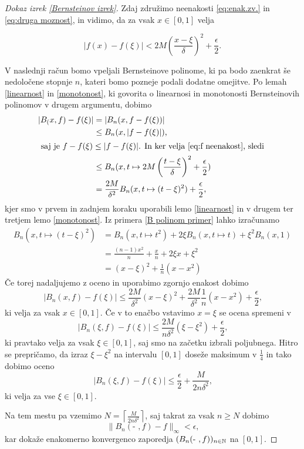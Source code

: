 \documentclass[a4paper, reqno]{amsart}
\theoremstyle{theorem}
\theoremstyle{definition}
\begin{document}
\begin{proof}[Dokaz \emph{izrek \ref{Bernsteinov izrek}}]
Zdaj združimo neenakosti \eqref{eq:enak.zv.} in \eqref{eq:druga moznost},
in vidimo, da za vsak $x \in [0,1]$ velja

\begin{equation}
	\label{eq:f neenakost}
	|f(x) - f(\xi)| < 2M\left( \frac{x - \xi}{\delta}\right)^2 + \frac{\epsilon}{2}\text{.}
\end{equation}

V naslednji račun bomo vpeljali Bernsteinove polinome, ki pa bodo zaenkrat še
nedoločene stopnje $n$, kateri bomo pozneje podali dodatne omejitve. Po lemah 
\ref{linearnost} in \ref{monotonost}, ki govorita o linearnosi in monotonosti 
Bernsteinovih polinomov v drugem argumentu, dobimo
\begin{align*}
	|B_(x, f) - f(\xi)| &= |B_n(x, f - f(\xi))|\\
	&\leq B_n(x, |f - f(\xi)|)\text{,}\\
\intertext{
		saj je $f - f(\xi) \leq |f - f(\xi)|$. In ker velja \eqref{eq:f neenakost}, sledi
}
	&\leq B_n(x, t \mapsto 2M\left(\frac{t - \xi}{\delta} \right)^2 + \frac{\epsilon}{2})\\
	&= \frac{2M}{\delta^2}B_n(x, t \mapsto (t - \xi)^2) + \frac{\epsilon}{2}\text{,}
\end{align*}
kjer smo v prvem in zadnjem koraku uporabili lemo \ref{linearnost} in v drugem ter
tretjem lemo \ref{monotonost}. Iz primera \ref{B polinom primer} lahko izračunamo
\begin{align*}
	B_n(x, t \mapsto (t - \xi)^2) &= 
	B_n(x, t \mapsto t^2) + 2\xi B_n(x, t \mapsto t) + \xi^2B_n(x, 1) \\
	&= \frac{(n - 1)x^2}{n} + \frac xn + 2\xi x + \xi^2 \\
	&= (x - \xi)^2 + \frac{1}{n}(x - x^2)
\end{align*}
Če torej nadaljujemo z oceno in uporabimo zgornjo enakost dobimo
$$
|B_n(x, f) - f(\xi)| \leq \frac{2M}{\delta^2}(x - \xi)^2 + 
\frac{2M}{\delta^2}\frac{1}{n}(x - x^2) + \frac{\epsilon}{2}\text{,}
$$
ki velja za vsak $x \in [0,1]$. Če v to enačbo vstavimo $x = \xi$ se ocena spremeni v
$$
|B_n(\xi, f) - f(\xi)| \leq  \frac{2M}{n\delta^2}(\xi - \xi^2) + \frac{\epsilon}{2}\text{,}
$$
ki pravtako velja za vsak $\xi \in [0,1]$, saj smo na začetku izbrali poljubnega. Hitro
se prepričamo, da izraz $\xi - \xi^2$ na intervalu $[0,1]$ doseže maksimum v $\frac{1}{4}$
in tako dobimo oceno
$$
|B_n(\xi, f) - f(\xi)| \leq \frac{\epsilon}{2} + \frac{M}{2n\delta^2}\text{,}
$$ 
ki velja za vse $\xi \in [0,1]$.

\par
Na tem mestu pa vzemimo $N = \left \lceil{\frac{M}{2n\delta^2}}\right \rceil$, saj
takrat za vsak $n \geq N$ dobimo
$$
\|B_n(\text{- }, f) - f\|_{\infty} < \epsilon\text{,}
$$
kar dokaže enakomerno konvergenco zaporedja $(B_n(\text{- },f))_{n \in \mathbb{N}}$ na $[0,1]$.
\end{proof}
\end{document}
